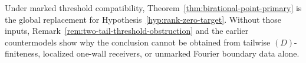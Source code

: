 Under marked threshold compatibility,
Theorem~\ref{thm:birational-point-primary} is the
global replacement for Hypothesis~\ref{hyp:rank-zero-target}.  Without those
inputs, Remark~\ref{rem:two-tail-threshold-obstruction} and the earlier
countermodels show why the conclusion
cannot be obtained from tailwise \((D)\)-finiteness, localized one-wall receivers,
or unmarked Fourier boundary data alone.
